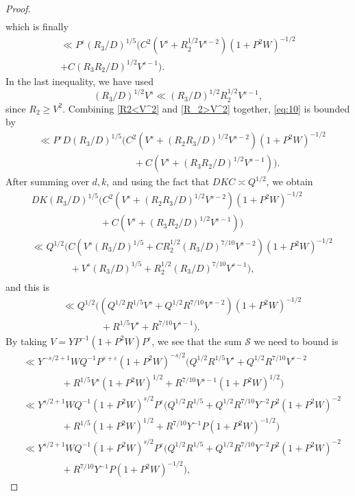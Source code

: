 \documentclass[letterpaper,11pt]{amsart}
\numberwithin{equation}{section}
\theoremstyle{definition}
\numberwithin{equation}{section}
\newcommand{\ve}{\varepsilon}
\begin{document}
\begin{proof}
\begin{multline*}
    \end{multline*}
which is finally
\begin{multline}
\ll P^{\ve} (R_3/D)^{1/5}\Big(C^2(V^s+R_2^{1/2}V^{s-2})(1+P^2W)^{-1/2}\\
+C(R_3R_2/D)^{1/2}V^{s-1}\Big).\label{R_2>V^2}
\end{multline}
In the last inequality, we have used 
\[(R_3/D)^{1/2}V^s\ll (R_3/D)^{1/2}R_2^{1/2}V^{s-1},\]
since $R_2\geq V^2$. Combining \eqref{R2<V^2} and \eqref{R_2>V^2} together, \eqref{eq:10} is bounded by
\begin{align*}
&\ll P^{\ve} D (R_3/D)^{1/5}\Big(C^2(V^s+(R_2R_3/D)^{1/2}V^{s-2})(1+P^2W)^{-1/2}\\& \hspace{4cm} \ \ +C(V^s+(R_3R_2/D)^{1/2}V^{s-1})\Big).
\end{align*} 
After summing over $d,k$, and using the fact that $DKC\asymp Q^{1/2}$, we obtain
\begin{align*}
& DK (R_3/D)^{1/5}\Big(C^2(V^s+(R_2R_3/D)^{1/2}V^{s-2})(1+P^2W)^{-1/2}\\& \hspace{3cm}
+C(V^s+(R_3R_2/D)^{1/2}V^{s-1})\Big)\\
&\ll Q^{1/2}\Big( C(V^s (R_3/D)^{1/5}+C R_2^{1/2}(R_3/D)^{7/10}V^{s-2})(1+P^2W)^{-1/2} \\& \quad \quad \quad \quad  +V^s(R_3/D)^{1/5}+R_2^{1/2}(R_3/D)^{7/10}V^{s-1}\Big),\\
\end{align*}
and this is
\begin{align*}
&\ll Q^{1/2}\Big((Q^{1/2}R^{1/5}V^s+Q^{1/2}R^{7/10}V^{s-2})(1+P^2W)^{-1/2}\\& \quad \quad \quad \quad  +R^{1/5}V^s+R^{7/10}V^{s-1}\Big).
\end{align*}
By taking $V=YP^{-1}(1+P^2W)P^\ve$, we see that the sum $\mathcal{S}$ we need to bound is
\begin{align*}
&\ll  Y^{-s/2+1}WQ^{-1} P^{s+\ve}(1+P^2W)^{-s/2}
\Big(Q^{1/2}R^{1/5}V^s+Q^{1/2}R^{7/10}V^{s-2}\\& \quad \quad \quad \quad +R^{1/5}V^s(1+P^2W)^{1/2}+R^{7/10}V^{s-1}(1+P^2W)^{1/2}\Big)
\\&\ll Y^{s/2+1}WQ^{-1} (1+P^2W)^{s/2}P^{\ve}\Big(Q^{1/2}R^{1/5}+Q^{1/2}R^{7/10}Y^{-2}P^2(1+P^2W)^{-2}\\& \quad \quad \quad \quad +R^{1/5}(1+P^2W)^{1/2}+R^{7/10}Y^{-1}P(1+P^2W)^{-1/2}\Big)\\&\ll Y^{s/2+1}WQ^{-1} (1+P^2W)^{s/2}P^{\ve}\Big(Q^{1/2}R^{1/5}+Q^{1/2}R^{7/10}Y^{-2}P^2(1+P^2W)^{-2}\\& \quad \quad \quad \quad +R^{7/10}Y^{-1}P(1+P^2W)^{-1/2}\Big),

\end{align*}
\end{proof}
\end{document}
